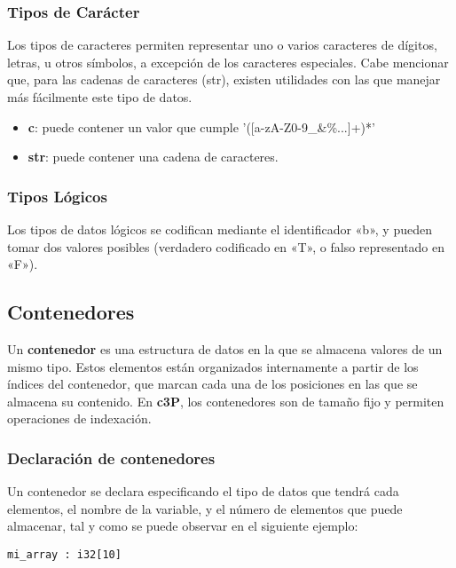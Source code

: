 \subsubsection{Tipos de Carácter}

Los tipos de caracteres permiten representar uno o varios caracteres de dígitos,
letras, u otros símbolos, a excepción de los caracteres especiales. Cabe mencionar
que, para las cadenas de caracteres (str), existen utilidades con las que manejar
más fácilmente este tipo de datos.

\begin{itemize}
    \item \textbf{c}: puede contener un valor que cumple '([a-zA-Z0-9\+\-\_\&\%...]+)*'
    \item \textbf{str}: puede contener una cadena de caracteres.
\end{itemize}

\subsubsection{Tipos Lógicos}

Los tipos de datos lógicos se codifican mediante el identificador «b», y pueden tomar dos
valores posibles (verdadero codificado en «T», o falso representado en «F»).

\subsection{Contenedores}

Un \textbf{contenedor} es una estructura de datos en la que se almacena valores de un
mismo tipo. Estos elementos están organizados internamente a partir de los índices del
contenedor, que marcan cada una de los posiciones en las que se almacena su contenido.
En \textbf{c3P}, los contenedores son de tamaño fijo y permiten operaciones de indexación.

\subsubsection{Declaración de contenedores}

Un contenedor se declara especificando el tipo de datos que tendrá cada elementos,
el nombre de la variable, y el número de elementos que puede almacenar, tal y como
se puede observar en el siguiente ejemplo:

\begin{verbatim}
mi_array : i32[10]    
\end{verbatim}

